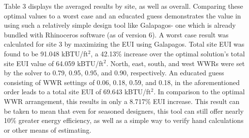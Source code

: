 \documentclass[sagev,times,Review,doublespace]{sagej}
\begin{document}
Table 3 displays the averaged results by site, as well as overall. Comparing these optimal values to a worst case and an educated guess demonstrates the value in using such a relatively simple design tool like Galapagos- one which is already bundled with Rhinoceros software (as of version 6). A worst case result was calculated for site 3 by maximizing the EUI using Galapagos. Total site EUI was found to be 91.048 kBTU/ft$^2$, a 42.13\% increase over the optimal solution's total site EUI value of 64.059 kBTU/ft$^2$. North, east, south, and west WWRs were set by the solver to 0.79, 0.95, 0.95, and 0.90, respectively. An educated guess consisting of WWR settings of 0.06, 0.18, 0.59, and 0.18, in the aforementioned order leads to a total site EUI of 69.643 kBTU/ft$^2$. In comparison to the optimal WWR arrangement, this results in only a 8.717\% EUI increase. This result can be taken to mean that even for seasoned designers, this tool can still offer nearly 10\% greater energy efficiency, as well as a simple way to verify hand calculations or other means of estimating. 

\begin{table}[h!]
\centering
{}
\label{results-table}
\caption{Optimized EUI Results}
\end{table}
\end{document}
